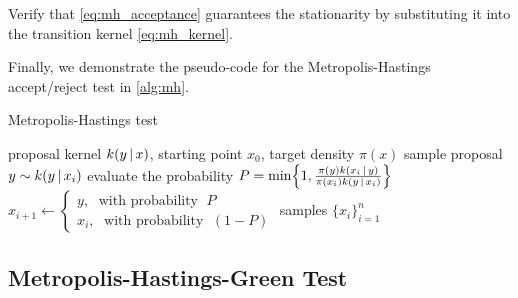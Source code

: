 \begin{exercise}
    Verify that \cref{eq:mh_acceptance} guarantees the stationarity by substituting it into the transition kernel \cref{eq:mh_kernel}.
\end{exercise}

Finally, we demonstrate the pseudo-code for the Metropolis-Hastings accept/reject test in \cref{alg:mh}.

\begin{algorithm}[t]
\caption{Metropolis-Hastings test}\label{alg:mh}
\begin{algorithmic}
\REQUIRE proposal kernel $k(y\,|\, x)$, starting point $x_0$, target density $\pi(x)$
\FOR{iterations $i \in [0,n)$}
\STATE sample proposal $y \sim k(y\,|\, x_i)$
\STATE evaluate the probability $P = \min\left\{1,\frac{\pi(y)k(x_i\cond y)}{\pi(x_i)k(y\cond x_i)}\right\}$
\STATE $x_{i+1} \gets \begin{cases}y, \;\text{ with probability }\; P\\
        x_i, \;\text{ with probability }\; (1-P)\end{cases}$
\ENDFOR
\RETURN samples $\{x_i\}_{i=1}^n$
\end{algorithmic}
\end{algorithm}

\subsection{Metropolis-Hastings-Green Test}

